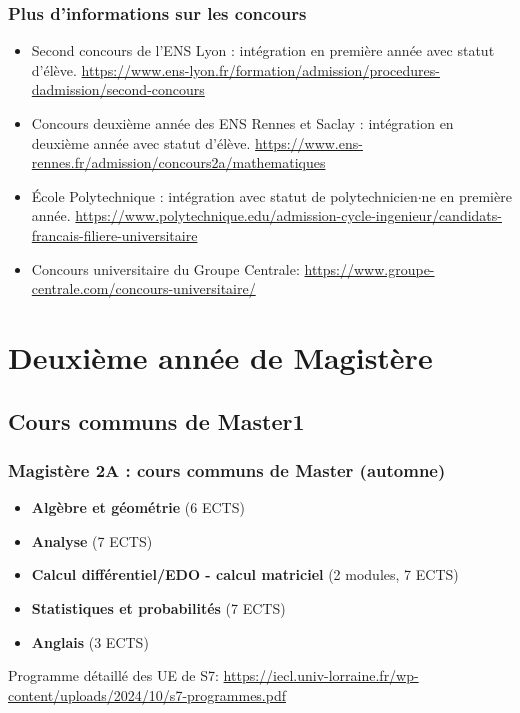 \documentclass[slidetop,11pt]{beamer}
\begin{document}
\begin{frame}
\frametitle{Plus d'informations sur les concours}


\begin{itemize}
\item \og Second concours\fg{} de l'ENS Lyon : intégration en première année avec statut d'élève. \url{https://www.ens-lyon.fr/formation/admission/procedures-dadmission/second-concours}
\item \og Concours deuxième année\fg{} des ENS Rennes et Saclay :  intégration en deuxième année avec statut d'élève. \url{https://www.ens-rennes.fr/admission/concours2a/mathematiques}
\item École Polytechnique : intégration avec statut de polytechnicien$\cdot$ne en première année. \url{https://www.polytechnique.edu/admission-cycle-ingenieur/candidats-francais-filiere-universitaire}
\item Concours universitaire du Groupe Centrale: \url{https://www.groupe-centrale.com/concours-universitaire/}
\end{itemize}

\end{frame}


\section{Deuxième année de Magistère}

\subsection{Cours communs de Master1}
\begin{frame}
\frametitle{Magistère 2A : cours communs de Master (automne)}
\begin{itemize}
\item \textbf{Algèbre et géométrie} (6 ECTS)
\item \textbf{Analyse} (7 ECTS)
\item \textbf{Calcul différentiel/EDO - calcul matriciel} (2 modules, 7 ECTS)
\item \textbf{Statistiques et probabilités} (7 ECTS)
\item \textbf{Anglais} (3 ECTS)
\end{itemize}

\bigskip
Programme détaillé des UE de S7: 
\url{https://iecl.univ-lorraine.fr/wp-content/uploads/2024/10/s7-programmes.pdf}
\end{frame}
\end{document}
